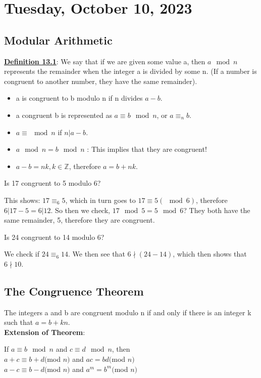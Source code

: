\section{Tuesday, October 10, 2023}

\subsection{Modular Arithmetic}

\textbf{\underline{Definition 13.1}}: We say that if we are given some value a, then $a \mod n$ represents the remainder when the integer a is divided by some n. (If a number is congruent to another number, they have the same remainder).

\begin{itemize}
    \item a is congruent to b modulo n if n divides $a - b$.
    \item a congruent b is represented as $a \equiv b \mod n$, or $a \equiv_n b$.
    \item $a \equiv \mod n$ if $n|a-b$.
    \item $a \mod n = b \mod n$ : This implies that they are congruent!
    \item $a-b=nk, k \in \mathbb{Z}$, therefore $a = b + nk$.
\end{itemize}

\begin{example}
    Is 17 congruent to 5 modulo 6?
\end{example}

This shows: $17 \equiv_6 5$, which in turn goes to $17 \equiv 5 (\mod 6)$, therefore $6 | 17-5 = 6|12$. So then we check, $17 \mod 5 = 5 \mod 6$? They both have the same remainder, 5, therefore they are congruent.

\begin{example}
    Is 24 congruent to 14 modulo 6?
\end{example}

We check if $24 \equiv_6 14.$ We then see that $6\nmid(24-14)$, which then shows that $6\nmid10$.

\subsection{The Congruence Theorem}

\begin{theorem}
    The integers a and b are congruent modulo n if and only if there is an integer k such that $a = b + kn$.\\
    \textbf{Extension of Theorem}:
    \begin{center}
        If $a \equiv b \mod n$ and $c \equiv d \mod n$, then\\
        $a+c\equiv b+d ($mod $n)$ and $ac=bd ($mod $n)$\\
        $a-c\equiv b-d ($mod $n)$ and $a^m=b^m ($mod $n)$
    \end{center}
\end{theorem}

